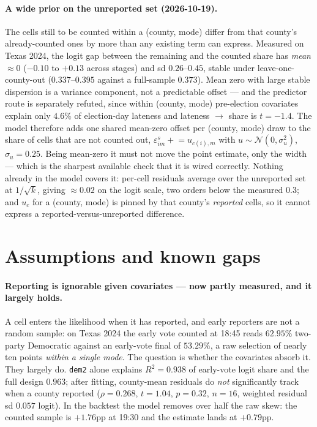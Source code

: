 \documentclass[11pt]{article}
\newcommand{\Norm}{\mathcal{N}}
\begin{document}
\paragraph{A wide prior on the unreported set (2026-10-19).} The cells still to be counted
within a (county, mode) differ from that county's already-counted ones by more than any
existing term can express. Measured on Texas 2024, the logit gap between the remaining and
the counted share has \emph{mean} $\approx 0$ ($-0.10$ to $+0.13$ across stages) and sd
$0.26$--$0.45$, stable under leave-one-county-out ($0.337$--$0.395$ against a full-sample
$0.373$). Mean zero with large stable dispersion is a variance component, not a predictable
offset --- and the predictor route is separately refuted, since within (county, mode)
pre-election covariates explain only $4.6\%$ of election-day lateness and lateness
$\to$ share is $t=-1.4$. The model therefore adds one shared mean-zero offset per
(county, mode) draw to the share of cells that are not counted out,
$\varepsilon^{s}_{im} \mathrel{+}= u_{c(i),m}$ with
$u \sim \Norm(0, \sigma_u^2)$, $\sigma_u = 0.25$. Being mean-zero it must not move the
point estimate, only the width --- which is the sharpest available check that it is wired
correctly. Nothing already in the model covers it: per-cell residuals average over the
unreported set at $1/\sqrt{k}$, giving $\approx 0.02$ on the logit scale, two orders below
the measured $0.3$; and $u_c$ for a (county, mode) is pinned by that county's
\emph{reported} cells, so it cannot express a reported-versus-unreported difference.

\section{Assumptions and known gaps}\label{sec:assume}

\paragraph{Reporting is ignorable given covariates --- now partly measured, and it
largely holds.} A cell enters the likelihood when it has reported, and early reporters are
not a random sample: on Texas 2024 the early vote counted at 18:45 reads $62.95\%$
two-party Democratic against an early-vote final of $53.29\%$, a raw selection of nearly
ten points \emph{within a single mode}. The question is whether the covariates absorb it.
They largely do. \texttt{dem2} alone explains $R^2 = 0.938$ of early-vote logit share and
the full design $0.963$; after fitting, county-mean residuals do \emph{not} significantly
track when a county reported ($\rho = 0.268$, $t = 1.04$, $p = 0.32$, $n = 16$, weighted
residual sd $0.057$ logit). In the backtest the model removes over half the raw skew: the
counted sample is $+1.76$pp at 19:30 and the estimate lands at $+0.79$pp.
\end{document}
